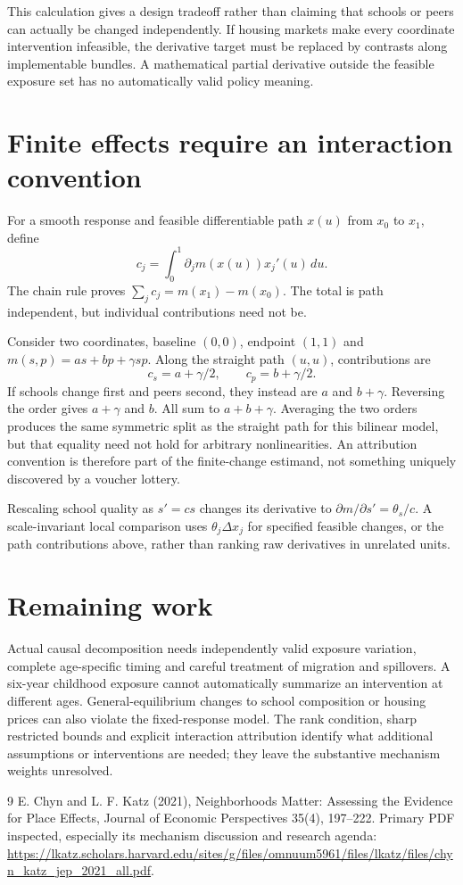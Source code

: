 \documentclass[11pt]{article}
\begin{document}
This calculation gives a design tradeoff rather than claiming that schools or peers can actually be changed independently. If housing markets make every coordinate intervention infeasible, the derivative target must be replaced by contrasts along implementable bundles. A mathematical partial derivative outside the feasible exposure set has no automatically valid policy meaning.

\section*{Finite effects require an interaction convention}
For a smooth response and feasible differentiable path $x(u)$ from $x_0$ to $x_1$, define
\[
 c_j=\int_0^1\partial_jm(x(u))x_j'(u)\,du.
\]
The chain rule proves $\sum_jc_j=m(x_1)-m(x_0)$. The total is path independent, but individual contributions need not be.

Consider two coordinates, baseline $(0,0)$, endpoint $(1,1)$ and
$m(s,p)=as+bp+\gamma sp$. Along the straight path $(u,u)$, contributions are
\[
 c_s=a+\gamma/2,\qquad c_p=b+\gamma/2.
\]
If schools change first and peers second, they instead are $a$ and $b+\gamma$. Reversing the order gives $a+\gamma$ and $b$. All sum to $a+b+\gamma$. Averaging the two orders produces the same symmetric split as the straight path for this bilinear model, but that equality need not hold for arbitrary nonlinearities. An attribution convention is therefore part of the finite-change estimand, not something uniquely discovered by a voucher lottery.

Rescaling school quality as $s'=cs$ changes its derivative to $\partial m/\partial s'=\theta_s/c$. A scale-invariant local comparison uses $\theta_j\Delta x_j$ for specified feasible changes, or the path contributions above, rather than ranking raw derivatives in unrelated units.

\section*{Remaining work}
Actual causal decomposition needs independently valid exposure variation, complete age-specific timing and careful treatment of migration and spillovers. A six-year childhood exposure cannot automatically summarize an intervention at different ages. General-equilibrium changes to school composition or housing prices can also violate the fixed-response model. The rank condition, sharp restricted bounds and explicit interaction attribution identify what additional assumptions or interventions are needed; they leave the substantive mechanism weights unresolved.
\begin{thebibliography}{9}
 E. Chyn and L. F. Katz (2021), Neighborhoods Matter: Assessing the Evidence for Place Effects, Journal of Economic Perspectives 35(4), 197--222. Primary PDF inspected, especially its mechanism discussion and research agenda:
\url{https://lkatz.scholars.harvard.edu/sites/g/files/omnuum5961/files/lkatz/files/chyn_katz_jep_2021_all.pdf}.
\end{thebibliography}
\end{document}
